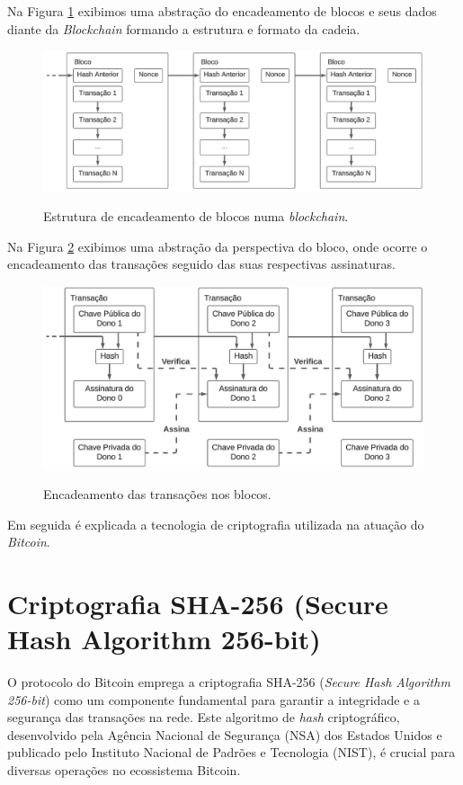 Na Figura \ref*{fig:blockchain} exibimos uma abstração do encadeamento de blocos e seus dados diante da \textit{Blockchain} formando a estrutura e formato da cadeia.

\begin{figure} [h]
	\centering
	\caption{Estrutura de encadeamento de blocos numa \textit{blockchain}.}
	\includegraphics[width=.8\linewidth]{../images/figura 2.png}
	\label{fig:blockchain}
\end{figure}

Na Figura \ref*{fig:transactions} exibimos uma abstração da perspectiva do bloco, onde ocorre o encadeamento das transações seguido das suas respectivas assinaturas.

\begin{figure} [h]
	\centering
	\caption{Encadeamento das transações nos blocos.}
	\includegraphics[width=.8\linewidth]{../images/figura 1.png}
	\label{fig:transactions}

\end{figure}

Em seguida é explicada a tecnologia de criptografia utilizada na atuação do \textit{Bitcoin}.

\section*{Criptografia SHA-256 (Secure Hash Algorithm 256-bit)} \label{subsec:sha256}
O protocolo do Bitcoin emprega a criptografia SHA-256 (\textit{Secure Hash Algorithm 256-bit}) como um componente fundamental para garantir a integridade e a segurança das transações na rede. Este algoritmo de \textit{hash} criptográfico, desenvolvido pela Agência Nacional de Segurança (NSA) dos Estados Unidos e publicado pelo Instituto Nacional de Padrões e Tecnologia (NIST), é crucial para diversas operações no ecossistema Bitcoin.

